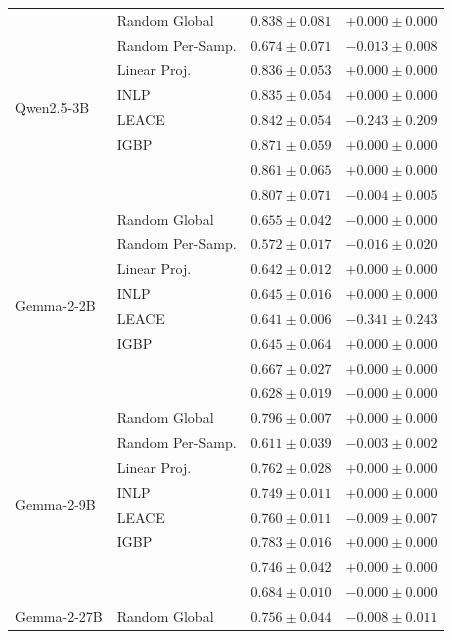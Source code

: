 \begin{longtable}{ll rr}
  \midrule
  \multirow{8}{*}{Qwen2.5-3B} & Random Global & $0.838{\pm}0.081$ & $+0.000{\pm}0.000$ \\
   & Random Per-Samp. & $0.674{\pm}0.071$ & $-0.013{\pm}0.008$ \\
   & Linear Proj. & $0.836{\pm}0.053$ & $+0.000{\pm}0.000$ \\
   & INLP & $0.835{\pm}0.054$ & $+0.000{\pm}0.000$ \\
   & LEACE & $0.842{\pm}0.054$ & $-0.243{\pm}0.209$ \\
   & IGBP & $0.871{\pm}0.059$ & $+0.000{\pm}0.000$ \\
   & \AmbGCE{} & $0.861{\pm}0.065$ & $+0.000{\pm}0.000$ \\
   & \TanGCE{} & \textbf{$0.807{\pm}0.071$} & $-0.004{\pm}0.005$ \\
  \midrule
  \multirow{8}{*}{Gemma-2-2B} & Random Global & $0.655{\pm}0.042$ & $-0.000{\pm}0.000$ \\
   & Random Per-Samp. & $0.572{\pm}0.017$ & $-0.016{\pm}0.020$ \\
   & Linear Proj. & $0.642{\pm}0.012$ & $+0.000{\pm}0.000$ \\
   & INLP & $0.645{\pm}0.016$ & $+0.000{\pm}0.000$ \\
   & LEACE & $0.641{\pm}0.006$ & $-0.341{\pm}0.243$ \\
   & IGBP & $0.645{\pm}0.064$ & $+0.000{\pm}0.000$ \\
   & \AmbGCE{} & $0.667{\pm}0.027$ & $+0.000{\pm}0.000$ \\
   & \TanGCE{} & \textbf{$0.628{\pm}0.019$} & $-0.000{\pm}0.000$ \\
  \midrule
  \multirow{8}{*}{Gemma-2-9B} & Random Global & $0.796{\pm}0.007$ & $+0.000{\pm}0.000$ \\
   & Random Per-Samp. & $0.611{\pm}0.039$ & $-0.003{\pm}0.002$ \\
   & Linear Proj. & $0.762{\pm}0.028$ & $+0.000{\pm}0.000$ \\
   & INLP & $0.749{\pm}0.011$ & $+0.000{\pm}0.000$ \\
   & LEACE & $0.760{\pm}0.011$ & $-0.009{\pm}0.007$ \\
   & IGBP & $0.783{\pm}0.016$ & $+0.000{\pm}0.000$ \\
   & \AmbGCE{} & $0.746{\pm}0.042$ & $+0.000{\pm}0.000$ \\
   & \TanGCE{} & \textbf{$0.684{\pm}0.010$} & $-0.000{\pm}0.000$ \\
  \midrule
  \multirow{8}{*}{Gemma-2-27B} & Random Global & $0.756{\pm}0.044$ & $-0.008{\pm}0.011$ \\

\end{longtable}
